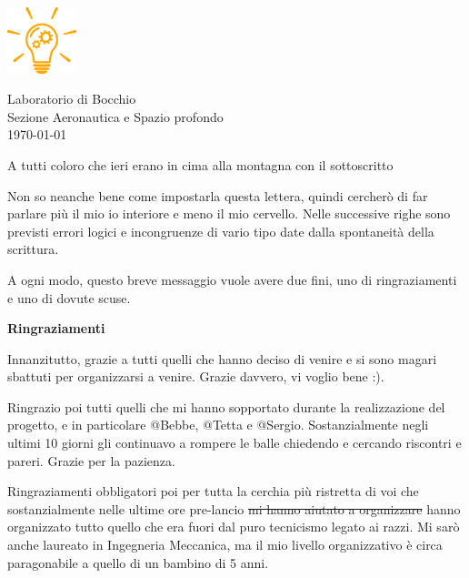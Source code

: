 \documentclass[12pt, a4paper]{article}
\begin{document}
\parbox{.35\linewidth}
{
    \begin{flushleft}
        \includegraphics[width=2cm]{Gear bulb icon.png}\\
    \end{flushleft}
}
\parbox{.6\linewidth}
{
    \begin{flushright}
        Laboratorio di Bocchio \\
        Sezione Aeronautica e Spazio profondo \\
        \vspace{1em}
        \today \\
    \end{flushright}
}

\vspace{3em}

\noindent A tutti coloro che ieri erano in cima alla montagna con il sottoscritto \\

\setlength{\parindent}{0pt}
\setlength{\parskip}{1.5em}

Non so neanche bene come impostarla questa lettera, quindi cercherò di far parlare più il mio io interiore e meno il mio cervello. Nelle successive righe sono previsti errori logici e incongruenze di vario tipo date dalla spontaneità della scrittura.

A ogni modo, questo breve messaggio vuole avere due fini, uno di ringraziamenti e uno di dovute scuse.

\textbf{Ringraziamenti}

Innanzitutto, grazie a tutti quelli che hanno deciso di venire e si sono magari sbattuti per organizzarsi a venire. Grazie davvero, vi voglio bene :).

Ringrazio poi tutti quelli che mi hanno sopportato durante la realizzazione del progetto, e in particolare @Bebbe, @Tetta e @Sergio.
Sostanzialmente negli ultimi 10 giorni gli continuavo a rompere le balle chiedendo e cercando riscontri e pareri. Grazie per la pazienza.

Ringraziamenti obbligatori poi per tutta la cerchia più ristretta di voi che sostanzialmente nelle ultime ore pre-lancio \st{mi hanno aiutato a organizzare} hanno organizzato tutto quello che era fuori dal puro tecnicismo legato ai razzi. Mi sarò anche laureato in Ingegneria Meccanica, ma il mio livello organizzativo è circa paragonabile a quello di un bambino di 5 anni.
\end{document}
